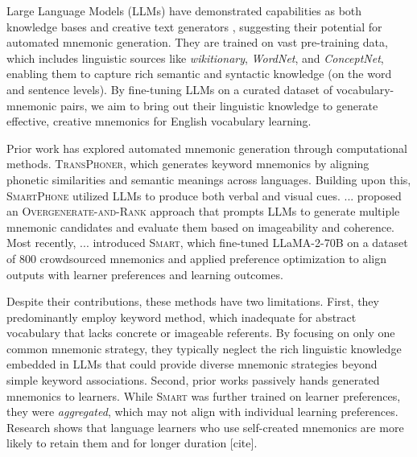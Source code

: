 \documentclass{article}
\begin{document}
Large Language Models (LLMs) have demonstrated capabilities as both knowledge bases \citep{petroni2019language, roberts2020much} and creative text generators \citep{brown2020language}, suggesting their potential for automated mnemonic generation. They are trained on vast pre-training data, which includes linguistic sources like \emph{wikitionary}, \emph{WordNet}, and \emph{ConceptNet}, enabling them to capture rich semantic and syntactic knowledge (on the word and sentence levels). By fine-tuning LLMs on a curated dataset of vocabulary-mnemonic pairs, we aim to bring out their linguistic knowledge to generate effective, creative mnemonics for English vocabulary learning.

Prior work has explored automated mnemonic generation through computational methods. \textsc{TransPhoner}, which generates keyword mnemonics by aligning phonetic similarities and semantic meanings across languages. Building upon this, \textsc{SmartPhone} utilized LLMs to produce both verbal and visual cues. ... proposed an \textsc{Overgenerate-and-Rank} approach that prompts LLMs to generate multiple mnemonic candidates and evaluate them based on imageability and coherence. Most recently, ... introduced \textsc{Smart}, which fine-tuned LLaMA-2-70B on a dataset of 800 crowdsourced mnemonics and applied preference optimization to align outputs with learner preferences and learning outcomes.

Despite their contributions, these methods have two limitations. First, they predominantly employ keyword method, which inadequate for abstract vocabulary that lacks concrete or imageable referents. By focusing on only one common mnemonic strategy, they typically neglect the rich linguistic knowledge embedded in LLMs that could provide diverse mnemonic strategies beyond simple keyword associations. Second, prior works passively hands generated mnemonics to learners. While \textsc{Smart} was further trained on learner preferences, they were \textit{aggregated}, which may not align with individual learning preferences. Research shows that language learners who use self-created mnemonics are more likely to retain them and for longer duration [cite].
\end{document}
